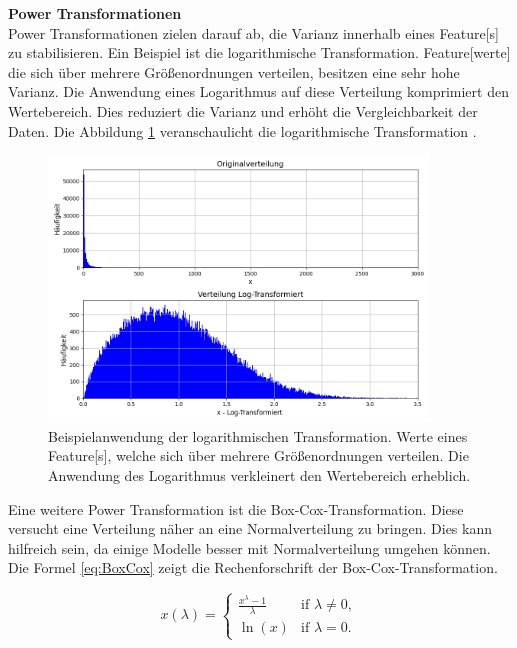 \textbf{Power Transformationen}\\
Power Transformationen zielen darauf ab, die Varianz innerhalb eines \gls{Feature}[s] zu stabilisieren. Ein Beispiel ist die logarithmische Transformation. \gls{Feature}[werte] die sich über mehrere Größenordnungen verteilen, besitzen eine sehr hohe Varianz. Die Anwendung eines Logarithmus auf diese Verteilung komprimiert den Wertebereich. Dies reduziert die Varianz und erhöht die Vergleichbarkeit der Daten. Die Abbildung \ref{fig:bspLogTrans} veranschaulicht die logarithmische Transformation \cite{Zheng.2018}. 

\begin{figure}[htb]
    \centering
    \includegraphics[width=0.9\textwidth]{img/Plots/Log-Transfomation.png}
    \caption[Beispielanwendung der logarithmischen Transformation.]{Beispielanwendung der logarithmischen Transformation. Werte eines \gls{Feature}[s], welche sich über mehrere Größenordnungen verteilen. Die Anwendung des Logarithmus verkleinert den Wertebereich erheblich.}
    \label{fig:bspLogTrans}
\end{figure}

Eine weitere Power Transformation ist die Box-Cox-Transformation. Diese versucht eine Verteilung näher an eine Normalverteilung zu bringen. Dies kann hilfreich sein, da einige Modelle besser mit Normalverteilung umgehen können. Die Formel \ref{eq:BoxCox} zeigt die Rechenforschrift der Box-Cox-Transformation.

\begin{equation}
    \label{eq:BoxCox}
    x(\lambda) = 
    \begin{cases} 
    \frac{x^\lambda - 1}{\lambda} & \text{if } \lambda \neq 0, \\
    \ln(x) & \text{if } \lambda = 0.
    \end{cases}
\end{equation}

